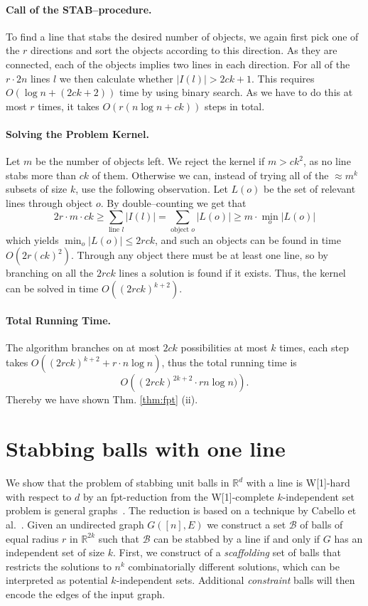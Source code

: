 \documentclass[12pt]{article}
\newcommand{\cclass}[1]{{#1}}
\newcommand{\wone}{\cclass{W[1]}}
\newcommand{\R}{\mathbb{R}}
\newcommand{\Rd}{\mathbb{R}^d}
\begin{document}
\paragraph{Call of the STAB--procedure.}
To find a line that stabs the desired number of objects, we again first pick one of the $r$ directions and sort the objects according to this direction. As they are connected, each of the objects implies two lines in each direction. For all of the $r\cdot 2n$ lines $l$ we then calculate whether $|I(l)| > 2ck + 1$. This requires $O(\log n + (2ck + 2))$ time by using binary search. As we have to do this at most $r$ times, it takes $O\left( r (n \log n + ck) \right)$ steps in total.
\paragraph{Solving the Problem Kernel.}
Let $m$ be the number of objects left. We reject the kernel if $m > ck^2$, as no line stabs more than $ck$ of them. 
Otherwise we can, instead of trying all of the $\approx m^k$ subsets of size $k$, use the following observation. Let $L(o)$ be the set of relevant lines through object $o$. By double--counting we get that
\[ 2r \cdot m \cdot ck \geq \sum_{\text{line }l}|I(l)| = \sum_{\text{object } o}|L(o)| \geq m \cdot \min_o|L(o)| \]
which yields $\min_o|L(o)| \leq 2rck$, and such an objects can be found in time $O(2r(ck)^2)$. Through any object there must be at least one line, so by branching on all the $2rck$ lines a solution is found if it exists. Thus, the kernel can be solved in time $O((2rck)^{k + 2})$.
\paragraph{Total Running Time.}
The algorithm branches on at most $2ck$ possibilities at most $k$ times, each step takes $O\left((2rck)^{k+2} + r \cdot n \log n\right)$, thus the total running time is
\[ O\left((2rck)^{2k+2} \cdot r n \log n) \right). \]
Thereby we have shown Thm. \ref{thm:fpt} (ii). 


\section{Stabbing balls with one line}\label{balls_one_line}
We show that the problem of stabbing unit balls in $\Rd$ with a line is \wone-hard with respect to $d$ by an fpt-reduction from 
the \wone-complete $k$-independent set problem is general graphs~\cite{DF99}.
The reduction is based on a technique by Cabello et al.~\cite{CGKR08, cgkmr-gcfpt-09}. 
Given an undirected graph $G([n], E)$ we construct a set $\mathcal{B}$ of 
balls of equal radius $r$ in $\R^{2k}$ such that 
$\mathcal{B}$ can be stabbed by a line if and only if $G$ has an independent set of size $k$. First, we construct of a \emph{scaffolding}
set of balls that restricts the solutions to $n^k$ combinatorially
different solutions, which can be interpreted as potential
$k$-independent sets. Additional \emph{constraint} balls
will then encode the edges of the input graph.
\end{document}
